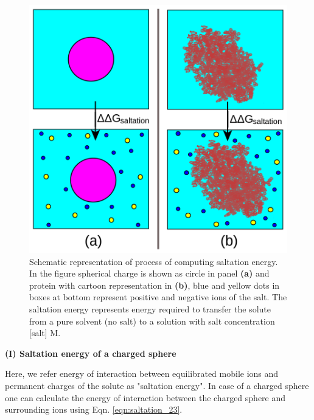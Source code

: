 \documentclass[9pt,tutorial,pubversion]{livecoms}
\begin{document}
\begin{figure}[hbt!]
\includegraphics[width=\linewidth]{Figure_6.png}
\caption{Schematic representation of process of computing saltation energy. In the figure spherical charge is shown as circle in panel \textbf{(a)} and protein with cartoon representation in \textbf{(b)}, blue and yellow dots in boxes at bottom represent positive and negative ions of the salt. The saltation energy represents energy required to transfer the solute from a pure solvent (no salt) to a solution with salt concentration [salt] M.}
\label{fig:scheme_saltation}
\end{figure}


\textbf{(I) Saltation energy of a charged sphere}

Here, we refer energy of interaction between equilibrated mobile ions and permanent charges of the solute as "saltation energy". In case of a charged sphere one can calculate the energy of interaction between the charged sphere and surrounding ions using Eqn. \ref{eqn:saltation_23}.
\end{document}
